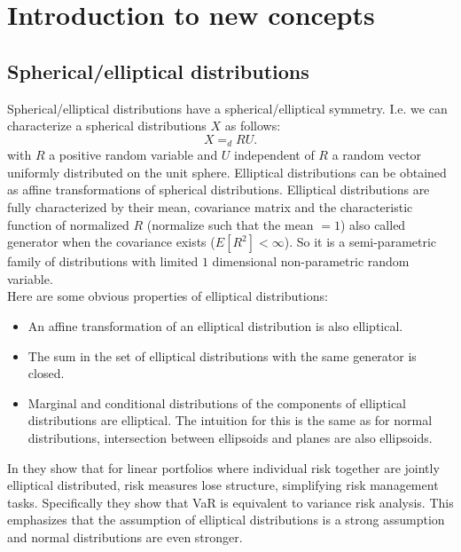 \documentclass[a4paper,12pt]{article}
\begin{document}
\section{Introduction to new concepts}

\subsection{Spherical/elliptical distributions}
Spherical/elliptical distributions have a spherical/elliptical symmetry. I.e.
we can characterize a spherical distributions $X$ as follows:
\begin{equation}
    X =_{d} R U
    .
\end{equation}
with $R$ a positive random variable and $U$ independent of $R$ a random vector uniformly distributed on the unit sphere.
Elliptical distributions can be obtained as affine transformations of spherical distributions. Elliptical distributions
are fully characterized by their mean, covariance matrix and the characteristic function of normalized $R$
(normalize such that the mean $=1$) also called generator when the covariance exists ($E[R^{2}]<\infty$).
So it is a semi-parametric family of distributions with
limited $1$ dimensional non-parametric random variable.  \\

Here are some obvious properties of elliptical distributions:
\begin{itemize}
    \item An affine transformation of an elliptical distribution is also elliptical.
    \item The sum in the set of elliptical distributions with the same generator is closed.
    \item Marginal and conditional  distributions of the components of elliptical distributions are elliptical. The intuition
          for this is the same as for normal distributions, intersection between ellipsoids and planes are also ellipsoids.
\end{itemize}

In \cite{dempster_correlation_2002} they show that for linear portfolios where individual risk together are jointly elliptical
distributed, risk measures lose structure, simplifying risk management tasks. Specifically they show that VaR is equivalent
to variance risk analysis. This emphasizes that the assumption of elliptical distributions is a strong assumption and
normal distributions are even stronger.
\end{document}
